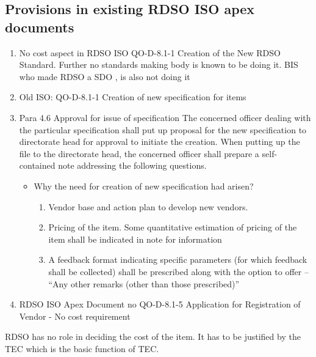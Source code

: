 \documentclass[
  11pt,
  twoside]{article}
\providecommand{\tightlist}{%
  \setlength{\itemsep}{0pt}\setlength{\parskip}{0pt}}
\begin{document}
\hypertarget{provisions-in-existing-rdso-iso-apex-documents}{%
\subsection{Provisions in existing RDSO ISO apex documents}\label{provisions-in-existing-rdso-iso-apex-documents}}

\begin{enumerate}
\def\labelenumi{\arabic{enumi}.}
\item
  No cost aspect in RDSO ISO QO-D-8.1-1 Creation of the New RDSO Standard. Further no standards making body is known to be doing it. BIS who made RDSO a SDO , is also not doing it
\item
  Old ISO: QO-D-8.1-1 Creation of new specification for items
\item
  Para 4.6 Approval for issue of specification The concerned officer dealing with the particular specification shall put up proposal for the new specification to directorate head for approval to initiate the creation. When putting up the file to the directorate head, the concerned officer shall prepare a self-contained note addressing the following questions.

  \begin{itemize}
  \tightlist
  \item
    Why the need for creation of new specification had arisen?

    \begin{enumerate}
    \def\labelenumii{\alph{enumii})}
    \tightlist
    \item
      Vendor base and action plan to develop new vendors.
    \item
      Pricing of the item. Some quantitative estimation of pricing of the item shall be indicated in note for information
    \item
      A feedback format indicating specific parameters (for which feedback shall be collected) shall be prescribed along with the option to offer -- ``Any other remarks (other than those prescribed)''
    \end{enumerate}
  \end{itemize}
\item
  RDSO ISO Apex Document no QO-D-8.1-5 Application for Registration of Vendor - No cost requirement
\end{enumerate}

RDSO has no role in deciding the cost of the item. It has to be justified by the TEC which is the basic function of TEC.
\end{document}
